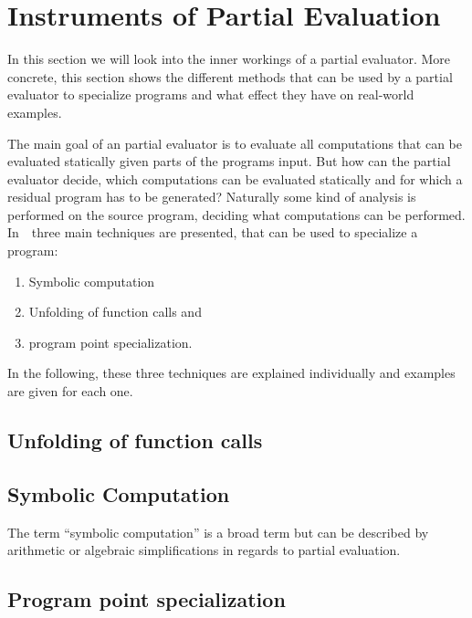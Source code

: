 
\section{Instruments of Partial Evaluation}\label{sec:instruments}

In this section we will look into the inner workings of a partial evaluator.
More concrete, this section shows the different methods that can be used by a partial evaluator to specialize programs and what effect they have on real-world examples.

The main goal of an partial evaluator is to evaluate all computations that can be evaluated statically given parts of the programs input.
But how can the partial evaluator decide, which computations can be evaluated statically and for which a residual program has to be generated?
Naturally some kind of analysis is performed on the source program, deciding what computations can be performed.
In~\cite[S.3]{Jones_PartialEvaluation}~three main techniques are presented, that can be used to specialize a program:

\begin{enumerate}
\item Symbolic computation
\item Unfolding of function calls and
\item program point specialization.
\end{enumerate}

In the following, these three techniques are explained individually and examples are given for each one.


\subsection{Unfolding of function calls}



\subsection{Symbolic Computation}

The term \enquote{symbolic computation} is a broad term but can be described by arithmetic or algebraic simplifications in regards to partial evaluation.


\citationneeded[Jones 132]


\subsection{Program point specialization}




